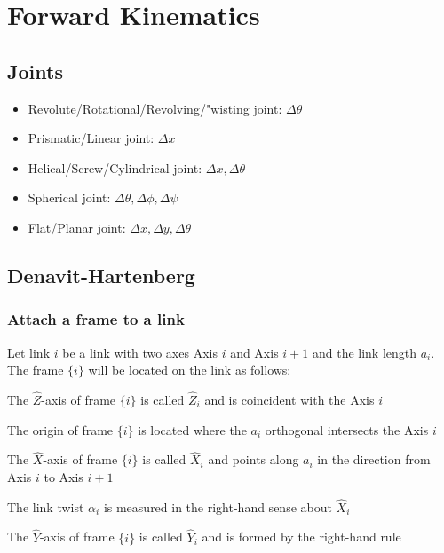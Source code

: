 \documentclass[10pt,a4paper]{article}
\begin{document}
\section{Forward Kinematics}
\subsection{Joints}
\begin{itemize}
	\item Revolute/Rotational/Revolving/"wisting joint: $\Delta \theta$
	\item Prismatic/Linear joint: $\Delta x$
	\item Helical/Screw/Cylindrical joint: $\Delta x, \Delta \theta$
	\item Spherical joint: $\Delta \theta, \Delta \phi, \Delta \psi$
	\item Flat/Planar joint: $\Delta x, \Delta y, \Delta \theta$
\end{itemize}

\subsection{Denavit-Hartenberg}
\subsubsection{Attach a frame to a link} 
Let link $i$ be a link with two axes Axis $i$ and Axis ${i+1}$ and the link length $a_i$. \\
The frame $\{i\}$ will be located on the link as follows:
\begin{description}
	\item The $\hat{Z}$-axis of frame $\{i\}$ is called $\hat{Z}_i$ and is coincident with the Axis $i$
	\item The origin of frame $\{i\}$ is located where the $a_i$ orthogonal intersects the Axis $i$
	\item The $\hat{X}$-axis of frame $\{i\}$ is called $\hat{X}_i$ and points along $a_i$ in the direction from Axis $i$ to Axis $i+1$
	\item The link twist $\alpha_i$ is measured in the right-hand sense about $\hat{X}_i$
	\item The $\hat{Y}$-axis of frame $\{i\}$ is called $\hat{Y}_i$ and is formed by the right-hand rule
\end{description}
\end{document}
